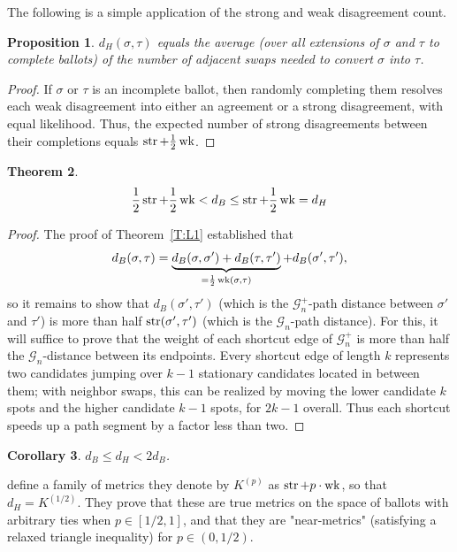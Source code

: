 \documentclass{amsart}
\newcommand{\G}{\mathcal{G}}
\newcommand{\str}{\mathop{\rm str}}
\newcommand{\wk}{\mathop{\rm wk}}
\theoremstyle{plain}
\newtheorem{theorem}{Theorem}[section]
\newtheorem{proposition}[theorem]{Proposition}
\newtheorem{corollary}[theorem]{Corollary}
\theoremstyle{definition}
\theoremstyle{remark}
\begin{document}
The following is a simple application of the strong and weak disagreement count.
\begin{proposition}\label{C:resolve}
$d_H(\sigma,\tau)$ equals the average (over all extensions of $\sigma$ and $\tau$ to complete ballots) of the number of adjacent swaps needed to convert $\sigma$ into $\tau$.
\end{proposition}
\begin{proof}
If $\sigma$ or $\tau$ is an incomplete ballot, then randomly completing them resolves each weak disagreement into either an agreement or a strong disagreement, with equal likelihood.  Thus, the expected number of strong disagreements between their completions equals $\str+\frac 12 \wk$. 
\end{proof}

\begin{theorem}\label{T:stwkB}
$$\frac 12 \str+\frac 12 \wk < d_B 
\le \str + \frac 12 \wk = d_H$$
\end{theorem}
\begin{proof}
The proof of Theorem~\ref{T:L1} established that
$$ d_B(\sigma,\tau) = 
\underbrace{d_B(\sigma,\sigma') + d_B(\tau,\tau')}_{=\frac 12 \wk(\sigma,\tau)}
+ d_B(\sigma',\tau'),$$
so it remains to show that $d_B(\sigma',\tau')$ (which is the $\G_n^+$-path distance between $\sigma'$ and $\tau'$) is more than half $\str(\sigma',\tau')$ (which is the $\G_n$-path distance).  For this, it will suffice to prove that the weight of each shortcut edge of $\G_n^+$ is more than half the $\G_n$-distance between its endpoints.  Every shortcut edge of length $k$ represents two candidates jumping over $k-1$ stationary candidates located in between them;  with neighbor swaps, this can be realized by moving the lower candidate $k$ spots and the higher candidate $k-1$ spots, for $2k-1$ overall.  Thus each shortcut speeds up a path segment by a factor less than two.
\end{proof}

\begin{corollary}\label{C:hihi}
$d_B\leq d_H < 2d_B$.
\end{corollary}

\citet{Fagin_Kumar_Mahdian_Sivakumar_Vee_2006} define a family of metrics they denote by $K^{(p)}$ as $\str+p\cdot \wk$, so that 
$d_H=K^{(1/2)}$.  They prove that these are true metrics on the space of ballots with arbitrary ties when $p\in [1/2,1]$, and that they are "near-metrics" (satisfying a relaxed triangle inequality) for $p\in (0,1/2)$.  
\end{document}
